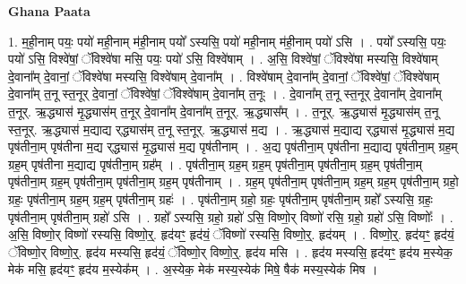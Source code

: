 \documentclass[17pt]{extarticle}
\begin{document}
\textbf{Ghana Paata } \newline

1. म॒ही॒नाम् पयः॒ पयो॑ मही॒नाम् म॑ही॒नाम् पयो᳚ ऽस्यसि॒ पयो॑ मही॒नाम् म॑ही॒नाम् पयो॑ ऽसि । . पयो᳚ ऽस्यसि॒ पयः॒ पयो॑ ऽसि॒ विश्वे॑षां॒ ॅविश्वे॑षा मसि॒ पयः॒ पयो॑ ऽसि॒ विश्वे॑षाम् । . अ॒सि॒ विश्वे॑षां॒ ॅविश्वे॑षा मस्यसि॒ विश्वे॑षाम् दे॒वाना᳚म् दे॒वानां॒ ॅविश्वे॑षा मस्यसि॒ विश्वे॑षाम् दे॒वाना᳚म् । . विश्वे॑षाम् दे॒वाना᳚म् दे॒वानां॒ ॅविश्वे॑षां॒ ॅविश्वे॑षाम् दे॒वाना᳚म् त॒नू स्त॒नूर् दे॒वानां॒ ॅविश्वे॑षां॒ ॅविश्वे॑षाम् दे॒वाना᳚म् त॒नूः । . दे॒वाना᳚म् त॒नू स्त॒नूर् दे॒वाना᳚म् दे॒वाना᳚म् त॒नूर्. ऋ॒द्ध्यास॑ मृ॒द्ध्यास॑म् त॒नूर् दे॒वाना᳚म् दे॒वाना᳚म् त॒नूर्. ऋ॒द्ध्यास᳚म् । . त॒नूर्. ऋ॒द्ध्यास॑ मृ॒द्ध्यास॑म् त॒नू स्त॒नूर्. ऋ॒द्ध्यास॑ म॒द्याद्य र्‌द्ध्यास॑म् त॒नू स्त॒नूर्. ऋ॒द्ध्यास॑ म॒द्य । . ऋ॒द्ध्यास॑ म॒द्याद्य र्‌द्ध्यास॑ मृ॒द्ध्यास॑ म॒द्य पृष॑तीना॒म् पृष॑तीना म॒द्य र्‌द्ध्यास॑ मृ॒द्ध्यास॑ म॒द्य पृष॑तीनाम् । . अ॒द्य पृष॑तीना॒म् पृष॑तीना म॒द्याद्य पृष॑तीना॒म् ग्रह॒म् ग्रह॒म् पृष॑तीना म॒द्याद्य पृष॑तीना॒म् ग्रह᳚म् । . पृष॑तीना॒म् ग्रह॒म् ग्रह॒म् पृष॑तीना॒म् पृष॑तीना॒म् ग्रह॒म् पृष॑तीना॒म् पृष॑तीना॒म् ग्रह॒म् पृष॑तीना॒म् पृष॑तीना॒म् ग्रह॒म् पृष॑तीनाम् । . ग्रह॒म् पृष॑तीना॒म् पृष॑तीना॒म् ग्रह॒म् ग्रह॒म् पृष॑तीना॒म् ग्रहो॒ ग्रहः॒ पृष॑तीना॒म् ग्रह॒म् ग्रह॒म् पृष॑तीना॒म् ग्रहः॑ । . पृष॑तीना॒म् ग्रहो॒ ग्रहः॒ पृष॑तीना॒म् पृष॑तीना॒म् ग्रहो᳚ ऽस्यसि॒ ग्रहः॒ पृष॑तीना॒म् पृष॑तीना॒म् ग्रहो॑ ऽसि । . ग्रहो᳚ ऽस्यसि॒ ग्रहो॒ ग्रहो॑ ऽसि॒ विष्णो॒र् विष्णो॑ रसि॒ ग्रहो॒ ग्रहो॑ ऽसि॒ विष्णोः᳚ । . अ॒सि॒ विष्णो॒र् विष्णो॑ रस्यसि॒ विष्णो॒र्॒. हृद॑यꣳ॒॒ हृद॑यं॒ ॅविष्णो॑ रस्यसि॒ विष्णो॒र्॒. हृद॑यम् । . विष्णो॒र्॒. हृद॑यꣳ॒॒ हृद॑यं॒ ॅविष्णो॒र् विष्णो॒र्॒. हृद॑य मस्यसि॒ हृद॑यं॒ ॅविष्णो॒र् 
विष्णो॒र्॒. हृद॑य मसि । . हृद॑य मस्यसि॒ हृद॑यꣳ॒॒ हृद॑य म॒स्येक॒ मेक॑ मसि॒ हृद॑यꣳ॒॒ हृद॑य म॒स्येक᳚म् । . अ॒स्येक॒ मेक॑ मस्य॒स्येक॑ मिषे॒ षैक॑ मस्य॒स्येक॑ मिष । \newline
\end{document}
